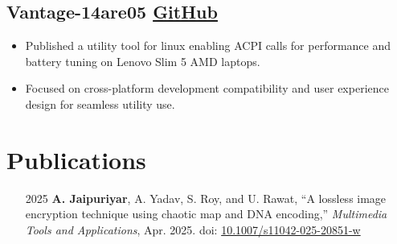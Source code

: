 \documentclass[10pt]{article}
\newcommand{\rside}[1]{
  \hfill {\small\color{accent} #1}%
}
\begin{document}
\subsection{Vantage-14are05 \rside{\href{https://github.com/ayushjaipuriyar/vantage-14are05}{GitHub}}}
\begin{itemize}
  \item Published a utility tool for linux enabling ACPI calls for performance and battery tuning on Lenovo Slim 5 AMD laptops.
  \item Focused on cross-platform development compatibility and user experience design for seamless utility use.
\end{itemize}


\section{Publications}
\begin{enumerate}
  \item [2025] \textbf{A. Jaipuriyar}, A. Yadav, S. Roy, and U. Rawat, “A lossless image encryption technique using chaotic map and DNA encoding,” \textit{Multimedia Tools and Applications}, Apr. 2025. doi: \href{https://doi.org/10.1007/s11042-025-20851-w}{10.1007/s11042-025-20851-w}
\end{enumerate}
\end{document}

